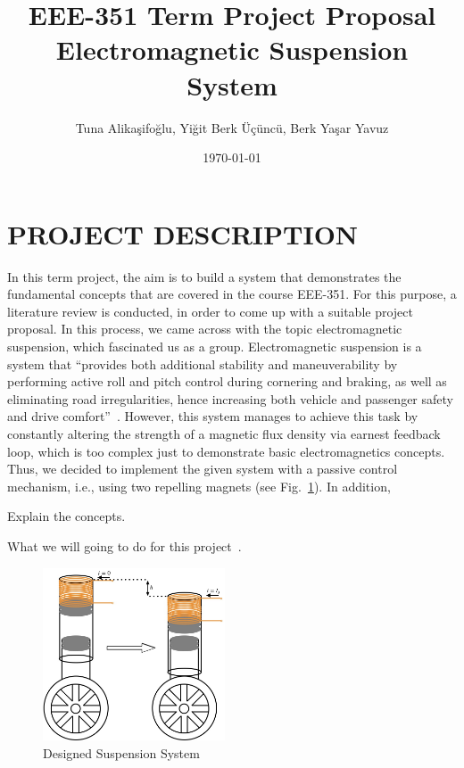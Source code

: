 \documentclass[a4paper, 12pt]{IEEEtran}
\title{EEE-351 Term Project Proposal \\ Electromagnetic Suspension System}
\author{Tuna Alikaşifoğlu, Yiğit Berk Üçüncü, Berk Yaşar Yavuz}
\date{\today}
\begin{document}
\maketitle

\section{PROJECT DESCRIPTION}
In this term project, the aim is to build a system that demonstrates the fundamental concepts that are covered in the course EEE-351. For this purpose, a literature review is conducted, in order to come up with a suitable project proposal. In this process, we came across with the topic electromagnetic suspension, which fascinated us as a group. Electromagnetic suspension is a system that ``provides both additional stability and maneuverability by performing active roll and pitch control during cornering and braking, as well as eliminating road irregularities, hence increasing both vehicle and passenger safety and drive comfort''~\autocite{active_suspension}. However, this system manages to achieve this task by constantly altering the strength of a magnetic flux density via earnest feedback loop, which is too complex just to demonstrate basic electromagnetics concepts. Thus, we decided to implement the given system with a passive control mechanism, i.e., using two repelling magnets (see Fig.~\ref{fig:suspension}). In addition, 

Explain the concepts.

What we will going to do for this project~\autocite{emt_textbook}.

\begin{figure}[h]
    \centering
    \includegraphics[width=0.48\textwidth, height=0.25\textheight, keepaspectratio]{suspension.jpeg}
    \caption{Designed Suspension System}\label{fig:suspension}
\end{figure}
\end{document}
